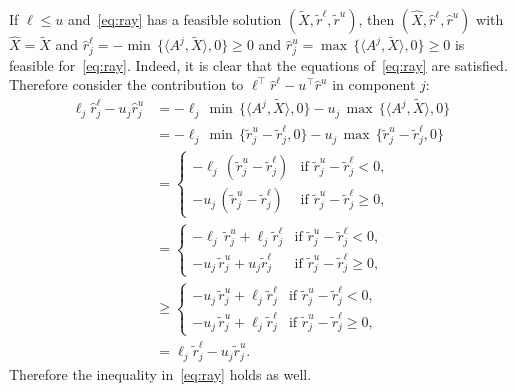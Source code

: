 \documentclass[10pt, a4paper]{article}
\newcommand{\skal}[2]{\langle{#1},{#2}\rangle}
\newcommand{\T}{^{\top}}
\begin{document}
If $\ell \leq u$ and~\eqref{eq:ray} has a feasible solution
$(\tilde{X}, \tilde{r}^\ell, \tilde{r}^u)$, then
$(\hat{X}, \hat{r}^\ell, \hat{r}^u)$ with $\hat{X} = \tilde{X}$ and
$\hat{r}^\ell_j = - \min\,\{\skal{A^j}{\tilde{X}}, 0\} \geq 0$ and
$\hat{r}^u_j = \max\,\{\skal{A^j}{\tilde{X}}, 0\} \geq 0$ is feasible
for~\eqref{eq:ray}. Indeed, it is clear that the equations
of~\eqref{eq:ray} are satisfied. Therefore consider the contribution to
$\ell\T \hat{r}^\ell - u\T \hat{r}^u$ in component $j$:
\begin{align*}
  \ell_j \hat{r}^\ell_j - u_j \hat{r}^u_j & = - \ell_j\, \min\,\{\skal{A^j}{\tilde{X}}, 0\} - u_j\, \max\,\{\skal{A^j}{\tilde{X}}, 0\}\\
  & = - \ell_j\, \min\,\{\tilde{r}^u_j - \tilde{r}^\ell_j, 0\} - u_j\, \max\,\{\tilde{r}^u_j - \tilde{r}^\ell_j, 0\}\\
  & = \begin{cases}
    - \ell_j\, (\tilde{r}^u_j - \tilde{r}^\ell_j) & \text{if } \tilde{r}^u_j - \tilde{r}^\ell_j < 0,\\
    - u_j\, (\tilde{r}^u_j - \tilde{r}^\ell_j) & \text{if } \tilde{r}^u_j - \tilde{r}^\ell_j \geq 0,
  \end{cases}\\
  & = \begin{cases}
    - \ell_j\, \tilde{r}^u_j + \ell_j \tilde{r}^\ell_j & \text{if } \tilde{r}^u_j - \tilde{r}^\ell_j < 0,\\
    - u_j\, \tilde{r}^u_j + u_j \tilde{r}^\ell_j & \text{if } \tilde{r}^u_j - \tilde{r}^\ell_j \geq 0,
  \end{cases}\\
  & \geq \begin{cases}
    - u_j\, \tilde{r}^u_j + \ell_j \tilde{r}^\ell_j & \text{if }  \tilde{r}^u_j - \tilde{r}^\ell_j < 0,\\
    - u_j\, \tilde{r}^u_j + \ell_j \tilde{r}^\ell_j & \text{if } \tilde{r}^u_j - \tilde{r}^\ell_j \geq 0,
  \end{cases}\\
  & = \ell_j \tilde{r}^\ell_j - u_j \tilde{r}^u_j.
\end{align*}
Therefore the inequality in~\eqref{eq:ray} holds as well.
\end{document}
